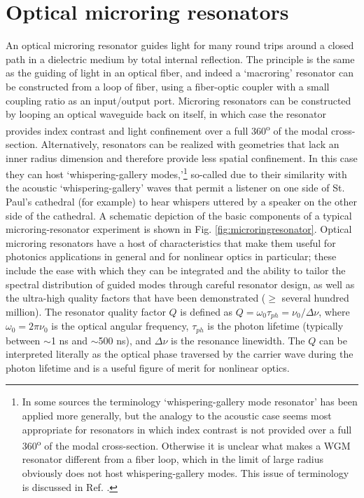  
 \section{Optical microring resonators} \label{sec:OMRR}
An optical microring resonator guides light for many round trips around a closed path in a dielectric medium by total internal reflection. The principle is the same as the guiding of light in an optical fiber, and indeed a `macroring' resonator can be constructed from a loop of fiber, using a fiber-optic coupler with a small coupling ratio as an input/output port. Microring resonators can be constructed by looping an optical waveguide back on itself, in which case the resonator provides index contrast and light confinement over a full 360\textsuperscript{o} of the modal cross-section. Alternatively, resonators can be realized with geometries that lack an inner radius dimension and therefore provide less spatial confinement. In this case they can host `whispering-gallery modes,'\footnote{In some sources the terminology `whispering-gallery mode resonator' has been applied more generally, but the analogy to the acoustic case seems most appropriate for resonators in which index contrast is not provided over a full 360\textsuperscript{o} of the modal cross-section. Otherwise it is unclear what makes a WGM resonator different from a fiber loop, which in the limit of large radius obviously does not host whispering-gallery modes. This issue of terminology is discussed in Ref. .} so-called due to their similarity with the acoustic `whispering-gallery' waves that permit a listener on one side of St. Paul's cathedral (for example) to hear whispers uttered by a speaker on the other side of the cathedral. A schematic depiction of the basic components of a typical microring-resonator experiment is shown in Fig. \ref{fig:microringresonator}. Optical microring resonators have a host of characteristics that make them useful for photonics applications in general and for nonlinear optics in particular; these include the ease with which they can be integrated and the ability to tailor the spectral distribution of guided modes through careful resonator design, as well as the ultra-high quality factors that have been demonstrated ($\geq$ several hundred million). The resonator quality factor $Q$ is defined as $Q=\omega_0 \tau_{ph}=\nu_0/\Delta\nu$, where $\omega_0=2\pi\nu_0$ is the optical angular frequency, $\tau_{ph}$ is the photon lifetime (typically between $\sim$1 ns and $\sim$500 ns), and $\Delta\nu$ is the resonance linewidth. The $Q$ can be interpreted literally as the optical phase traversed by the carrier wave during the photon lifetime and is a useful figure of merit for nonlinear optics.

